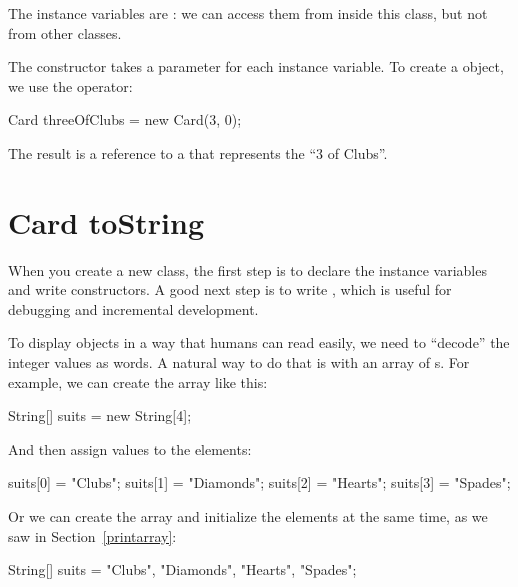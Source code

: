 
The instance variables are : we can access them from inside this class, but not from other classes.

The constructor takes a parameter for each instance variable.
To create a  object, we use the  operator:

\begin{code}
Card threeOfClubs = new Card(3, 0);
\end{code}

The result is a reference to a  that represents the ``3 of Clubs''.


\section{Card toString}


When you create a new class, the first step is to declare the instance variables and write constructors.
A good next step is to write , which is useful for debugging and incremental development.


To display  objects in a way that humans can read easily, we need to ``decode'' the integer values as words.
A natural way to do that is with an array of s.
For example, we can create the array like this:

\begin{code}
String[] suits = new String[4];
\end{code}

And then assign values to the elements:

\begin{code}
suits[0] = "Clubs";
suits[1] = "Diamonds";
suits[2] = "Hearts";
suits[3] = "Spades";
\end{code}

Or we can create the array and initialize the elements at the same time, as we saw in Section~\ref{printarray}:

\begin{code}
String[] suits = {"Clubs", "Diamonds", "Hearts", "Spades"};
\end{code}


